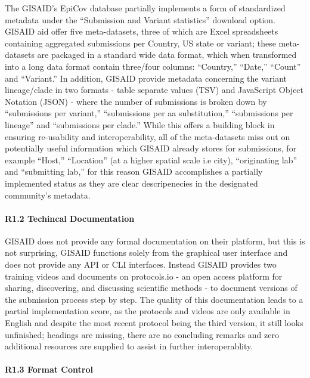 \documentclass{article}
\begin{document}
The GISAID's EpiCov database partially implements a form of standardized
metadata under the ``Submission and Variant statistics'' download
option. GISAID aid offer five meta-datasets, three of which are Excel
spreadsheets containing aggregated submissions per Country, US state or
variant; these meta-datasets are packaged in a standard wide data
format, which when transformed into a long data format contain
three/four columns: ``Country,'' ``Date,'' ``Count'' and ``Variant.'' In
addition, GISAID provide metadata concerning the variant lineage/clade
in two formats - table separate values (TSV) and JavaScript Object
Notation (JSON) - where the number of submissions is broken down by
``submissions per variant,'' ``submissions per aa substitution,''
``submissions per lineage'' and ``submissions per clade.'' While this
offers a building block in ensuring re-usability and interoperability,
all of the meta-datasets miss out on potentially useful information
which GISAID already stores for submissions, for example ``Host,''
``Location'' (at a higher spatial scale i.e city), ``originating lab''
and ``submitting lab,'' for this reason GISAID accomplishes a partially
implemented status as they are clear descripenecies in the designated
community's metadata.

\hypertarget{r1.2-techincal-documentation}{%
\paragraph{R1.2 Techincal
Documentation}\label{r1.2-techincal-documentation}}

GISAID does not provide any formal documentation on their platform, but
this is not surprising, GISAID functions solely from the graphical user
interface and does not provide any API or CLI interfaces. Instead GISAID
provides two training videos and documents on protocols.io - an open
access platform for sharing, discovering, and discussing scientific
methods - to document versions of the submission process step by step.
The quality of this documentation leads to a partial implementation
score, as the protocols and videos are only available in English and
despite the most recent protocol being the third version, it still looks
unfinished; headings are missing, there are no concluding remarks and
zero additional resources are supplied to assist in further
interoperablity.

\hypertarget{r1.3-format-control}{%
\paragraph{R1.3 Format Control}\label{r1.3-format-control}}
\end{document}
